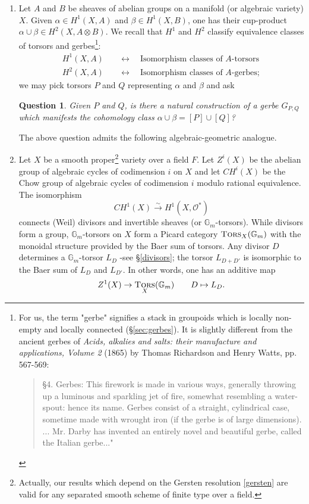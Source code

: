 \documentclass{amsart}
\numberwithin{equation}{subsection}
\newtheorem{question}[theorem]{Question}
\theoremstyle{remark}
\theoremstyle{remark}
\newcommand{\too}{\longrightarrow}%
\newcommand{\cO}{\mathcal{O}}
\newcommand{\bbG}{\mathbb{G}}
\DeclareMathOperator{\tors}{\textsc{Tors}} %
\begin{document}
\begin{enumerate} 
\item Let $A$ and $B$ be sheaves of abelian groups on a manifold (or algebraic variety) $X$. Given $\alpha \in H^1(X,A)$ and $\beta \in H^1(X,B)$, one has their cup-product $\alpha \cup \beta \in H^2(X, A\otimes B)$. We recall that $H^1$ and $H^2$ classify equivalence classes of torsors and gerbes\footnote{For us, the term "gerbe" signifies a stack in groupoids which is locally non-empty and locally connected (\S \ref{sec:gerbes}).  It is slightly different from the ancient gerbes of  \textit{Acids, alkalies and salts: their manufacture and applications, Volume 2} (1865) by Thomas Richardson and Henry Watts, pp. 567-569: 
\begin{quote}
  \S 4. Gerbes: This firework is made in various ways, generally throwing up a luminous and sparkling jet of fire, somewhat resembling a 
water-spout: hence its name. Gerbes consist of a straight, cylindrical case, sometime made with wrought iron (if the gerbe is 
of large dimensions). ...  Mr. Darby has invented an entirely novel and beautiful gerbe, called the Italian gerbe..."
\end{quote}}:
\begin{align*}
  H^1(X, A) \quad &\longleftrightarrow \quad \text{Isomorphism classes of $A$-torsors} \\
  H^2(X, A) \quad &\longleftrightarrow \quad \text{Isomorphism classes of $A$-gerbes};
\end{align*}
we may pick torsors $P$ and $Q$ representing $\alpha$ and $\beta$ and ask
\begin{question}\label{Q1}
  Given $P$ and $Q$, is there a natural construction of a gerbe $G_{P,Q}$ which manifests the cohomology class $\alpha \cup\beta =[P] \cup [Q]$?
\end{question}
The above question admits the following algebraic-geometric analogue. 
\item Let $X$ be a smooth proper\footnote{Actually, our results which depend on the Gersten resolution \eqref{gersten} are valid for any separated smooth scheme of 
finite type over a field.}  variety over a field $F$. Let $Z^i(X)$ be the abelian group of algebraic cycles of codimension $i$ on $X$ and let $CH^i(X)$ be the Chow group of algebraic cycles of codimension $i$ modulo rational equivalence.  The  isomorphism
  \begin{equation*}
    CH^1(X) \overset{\sim}{\too} H^1(X, \cO^*) 
  \end{equation*}
  connects (Weil) divisors and invertible sheaves (or $\bbG_m$-torsors). While divisors form a group,  $\bbG_m$-torsors on $X$ form a Picard category $\tors_X(\bbG_m)$ with the monoidal structure provided by the Baer sum of torsors. Any divisor $D$ determines a $\bbG_m$-torsor $L_D$ -see \S \ref{divisors};  the torsor 
 $L_{D +D'}$ is isomorphic to the Baer sum of $L_D$ and $L_{D'}$. In other words, one has an additive map \cite[II, Proposition 6.13]{Hartshorne}
 \begin{equation}\label{zee-one}
 Z^1(X) \to \tors_X(\bbG_m) \qquad D \mapsto L_D.
 \end{equation}
  

\end{enumerate}
\end{document}
